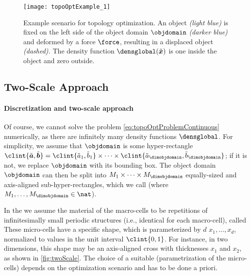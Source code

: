 \begin{SCfigure}
  \texttt{[image: topoOptExample\_1]}%
  \caption[%
    Example scenario for topology optimization%
  ]{%
    Example scenario for topology optimization.
    An object \emph{\textcolor{hellblau}{(light blue)}}
    is fixed on the left side
    of the object domain $\objdomain$
    \emph{\textcolor{mittelblau!50}{(darker blue)}}
    and deformed by a force $\force$, resulting in a displaced object
    \emph{(dashed).}
    The density function $\densglobal(\tilde{\*x})$ is one inside the object
    and zero outside.%
  }%
  \label{fig:topoOptExample}%
\end{SCfigure}



\subsection{Two-Scale Approach}
\label{sec:612twoScale}

\paragraph{Discretization and two-scale approach}

Of course, we cannot solve the problem \eqref{eq:topoOptProblemContinuous}
numerically,
as there are infinitely many density functions $\densglobal$.
For simplicity, we assume that $\objdomain$ is some hyper-rectangle
$\clint{\tilde{\*a}, \tilde{\*b}}
= \clint{\tilde{a}_1, \tilde{b}_1} \times \dotsb \times
\clint{\tilde{a}_{\dimobjdomain}, \tilde{b}_{\dimobjdomain}}$;
if it is not, we replace $\objdomain$ with its bounding box.
The object domain $\objdomain$ can then be split into
$M_1 \times \dotsb \times M_{\dimobjdomain}$
equally-sized and axis-aligned sub-hyper-rectangles,
which we call 
(where $M_1, \dotsc, M_{\dimobjdomain} \in \nat$).

In the 
we assume the material of the macro-cells to be
repetitions of infinitesimally small periodic structures
(i.e., identical for each macro-cell),
called 
These micro-cells have a specific shape, which is parameterized by
$d$  $x_1, \dotsc, x_d$,
normalized to values in the unit interval $\clint{0, 1}$.
For instance, in two dimensions,
this shape may be an axis-aligned cross
with thicknesses $x_1$ and $x_2$, as shown in \cref{fig:twoScale}.
The choice of a suitable 
(parametrization of the micro-cells)
depends on the optimization scenario and has to be done a priori.

